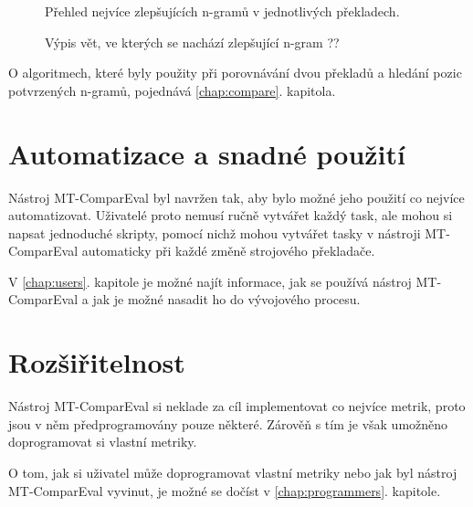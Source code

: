 \begin{figure}
	\caption{Přehled nejvíce zlepšujících n-gramů v jednotlivých překladech.}
	\label{img:confirmed_ngrams}
\end{figure}

\begin{figure}
	\caption{Výpis vět, ve kterých se nachází zlepšující n-gram ??}
	\label{img:filtered_sentences}
\end{figure}

O algoritmech,
  které byly použity při porovnávání dvou překladů a hledání pozic potvrzených n-gramů,
  pojednává \ref{chap:compare}. kapitola.


\section{Automatizace a snadné použití}
Nástroj MT-ComparEval byl navržen tak,
  aby bylo možné jeho použití co nejvíce automatizovat.
Uživatelé proto nemusí ručně vytvářet každý task,
  ale mohou si napsat jednoduché skripty,
  pomocí nichž mohou vytvářet tasky v nástroji MT-ComparEval automaticky při každé změně strojového překladače.

V \ref{chap:users}. kapitole je možné najít informace,
  jak se používá nástroj MT-ComparEval
  a jak je možné nasadit ho do vývojového procesu.

\section{Rozšiřitelnost}
Nástroj MT-ComparEval si neklade za cíl implementovat co nejvíce metrik,
  proto jsou v něm předprogramovány pouze některé.
Zárověň s tím je však umožněno doprogramovat si vlastní metriky.

O tom, jak si uživatel může doprogramovat vlastní metriky nebo jak byl nástroj MT-ComparEval vyvinut,
  je možné se dočíst v \ref{chap:programmers}. kapitole.

